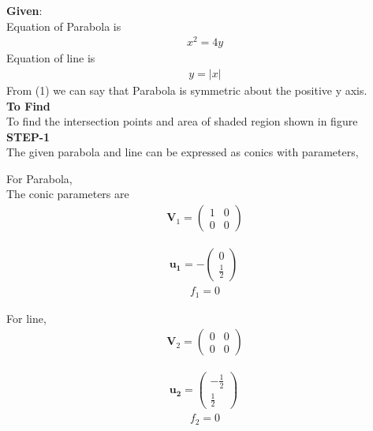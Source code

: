 \documentclass[10pt,a4paper]{report}
\newcommand{\myvec}[1]{\ensuremath{\begin{pmatrix}#1\end{pmatrix}}}
\let\vec\mathbf
\let\vec\mathbf
\begin{document}
\begin{multicols}{2}
\raggedright \textbf{Given}:\vspace{2mm}\\

Equation of Parabola is \\ \vspace{1mm}
\begin{align}
x^2=4y 
\end{align}
Equation of line is \\\vspace{1mm}
\begin{align}
y=|x|
\end{align}
From (1) we can say that Parabola is symmetric about the positive y axis.\\ \vspace{2mm}
\textbf{To Find }\vspace{2mm}\\
To find the intersection points and area of shaded region shown in figure\vspace{2mm}  \\ 
\textbf{STEP-1}\vspace{2mm}\\
The given parabola and line can be expressed as conics with parameters,\\ \vspace{1mm}

For Parabola,\\\vspace{1mm}
The conic parameters are
\begin{align}
\vec{V}_1=\myvec{
1 & 0\\
0 & 0
}
\end{align} 

\begin{align}
\vec{u_1}= -\myvec{
0\\
\frac{1}{2}
}\
\end{align} 
\begin{align}
f_1=0
\end{align} \vspace{2mm}

For line,\\\vspace{1mm}
\begin{align}
\vec{V}_2=\myvec{
0 & 0\\
0 & 0
}
\end{align} 


\begin{align}
\vec{u_2}= \myvec{
-\frac{1}{2}\\
\frac{1}{2}
}\
\end{align} 
\begin{align}
f_2=0
\end{align} \vspace{2mm}



\end{multicols}
\end{document}
